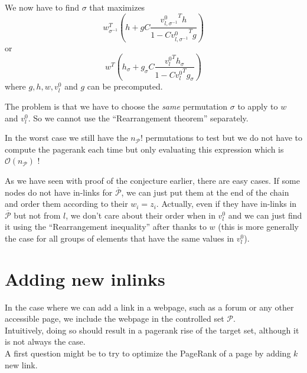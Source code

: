 \documentclass{article}
\newcommand{\bigoh}{\mathcal{O}}
\newcommand{\1}{\mathbf{1}}
\theoremstyle{definition}
\begin{document}
We now have to find $\sigma$ that maximizes
\[ w_{\sigma^{-1}}^T \left(h + g C \frac{{v_{l,\sigma^{-1}}^0}^Th}{1 - C {v_{l,\sigma^{-1}}^0}^Tg}\right) \]
or
\[ w^T \left(h_\sigma + g_\sigma C \frac{{v_l^0}^Th_\sigma}{1 - C {v_l^0}^Tg_\sigma}\right) \]
where \(g,h,w,v_l^0\) and \(g\) can be precomputed.

The problem is that we have to choose the \emph{same} permutation \(\sigma\) to apply to \(w\) and \(v_l^0\).
So we cannot use the ``Rearrangement theorem'' separately.

In the worst case we still have the \(n_\mathcal{P}!\) permutations to test
but we do not have to compute the pagerank each time but only evaluating this expression which is \(\bigoh(n_\mathcal{P})\) !

As we have seen with proof of the conjecture earlier, there are easy cases.
If some nodes do not have in-links for $\overline{\mathcal{P}}$, we can just put them at the end of the chain and order them
according to their $w_i = z_i$.
Actually, even if they have in-links in $\overline{\mathcal{P}}$ but not from $l$,
we don't care about their order when in $v_l^0$ and we can just find it using the ``Rearrangement inequality'' after thanks to $w$ (this is more generally the case for all groups of elements that have the same values in $v_l^0$).

%

\section{Adding new inlinks}
In the case where we can add a link in a webpage, such as a forum or any other accessible page, we include the webpage in the controlled set \(\mathcal{P}\).\\
Intuitively, doing so should result in a pagerank rise of the target set, although it is not always the case.\\
A first question might be to try to optimize the PageRank of a page
by adding \(k\) new link.
\end{document}
